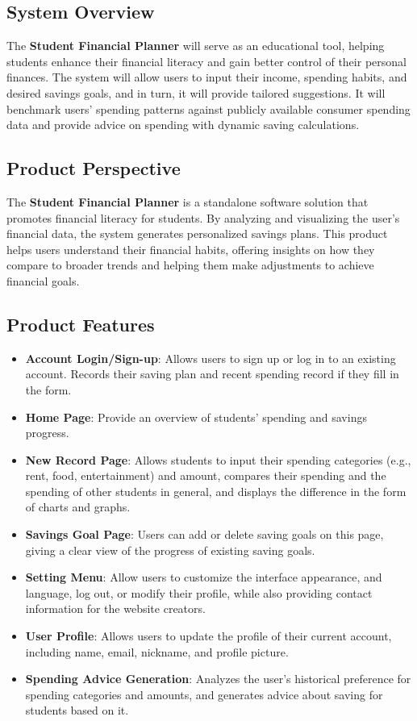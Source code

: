 \documentclass{article}
\begin{document}
\subsection{System Overview}
The \textbf{Student Financial Planner} will serve as an educational tool, helping students enhance their financial literacy and gain better control of their personal finances. The system will allow users to input their income, spending habits, and desired savings goals, and in turn, it will provide tailored suggestions. It will benchmark users' spending patterns against publicly available consumer spending data and provide advice on spending with dynamic saving calculations. 

\subsection{Product Perspective}
The \textbf{Student Financial Planner} is a standalone software solution that promotes financial literacy for students. By analyzing and visualizing the user's financial data, the system generates personalized savings plans. This product helps users understand their financial habits, offering insights on how they compare to broader trends and helping them make adjustments to achieve financial goals.

\subsection{Product Features}
\begin{itemize}
    \item \textbf{Account Login/Sign-up}: Allows users to sign up or log in to an existing account. Records their saving plan and recent spending record if they fill in the form.
    \item \textbf{Home Page}: Provide an overview of students' spending and savings progress.
    \item \textbf{New Record Page}:  Allows students to input their spending categories (e.g., rent, food, entertainment) and amount, compares their spending and the spending of other students in general, and displays the difference in the form of charts and graphs.
    \item \textbf{Savings Goal Page}: Users can add or delete saving goals on this page, giving a clear view of the progress of existing saving goals.
    \item \textbf{Setting Menu}: Allow users to customize the interface appearance, and language, log out, or modify their profile, while also providing contact information for the website creators.
    \item \textbf{User Profile}: Allows users to update the profile of their current account, including name, email, nickname, and profile picture.
    \item \textbf{Spending Advice Generation}: Analyzes the user's historical preference for spending categories and amounts, and generates advice about saving for students based on it. 
    
\end{itemize}
\end{document}
